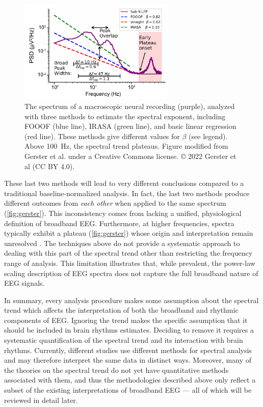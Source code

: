 \begin{figure}
\vspace{-15pt}
\includegraphics[width=75mm]{Figures/chapter1/gerster.pdf}
\vspace{-10pt}
\caption{  The spectrum of a macroscopic neural recording (purple), analyzed with three methods to estimate the spectral exponent, including FOOOF (blue line), IRASA (green line), and basic linear regression (red line). These methods give different values for $\beta$ (see legend). Above \qty{100}{\hertz}, the spectral trend plateaus. Figure modified from Gerster et al. \cite{Gerster2022} under a Creative Commons license. © 2022 Gerster et al (CC BY 4.0).
} \label{fig:gerster}
\end{figure}

These last two methods will lead to very different conclusions compared to a traditional baseline-normalized analysis. In fact, the last two methods produce different outcomes from \textit{each other} when applied to the same spectrum (\autoref{fig:gerster}). This inconsistency comes from lacking a unified, physiological definition of broadband EEG. Furthermore, at higher frequencies, spectra typically exhibit a plateau  (\autoref{fig:gerster}) whose origin and interpretation remain unresolved \cite{Gerster2022}. The techniques above do not provide a systematic approach to dealing with this part of the spectral trend other than restricting the frequency range of analysis. This limitation illustrates that, while prevalent, the power-law scaling description of EEG spectra does not capture the full broadband nature of EEG signals. 

In summary, every analysis procedure makes some assumption about the spectral trend which affects the interpretation of both the broadband and rhythmic components of EEG. Ignoring the trend makes the specific assumption that it should be included in brain rhythms estimates. Deciding to remove it requires a systematic quantification of the spectral trend and its interaction with brain rhythms. Currently, different studies use different methods for spectral analysis and may therefore interpret the same data in distinct ways. Moreover, many of the theories on the spectral trend do not yet have quantitative methods associated with them, and thus the methodologies described above only reflect a subset of the existing interpretations of broadband EEG --- all of which will be reviewed in detail later.

